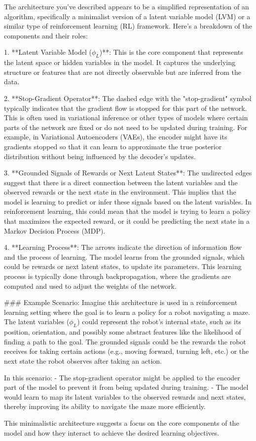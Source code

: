 The architecture you've described appears to be a simplified representation of an algorithm, specifically a minimalist version of a latent variable model (LVM) or a similar type of reinforcement learning (RL) framework. Here's a breakdown of the components and their roles:

1. **Latent Variable Model ($\phi_L$)**: This is the core component that represents the latent space or hidden variables in the model. It captures the underlying structure or features that are not directly observable but are inferred from the data.

2. **Stop-Gradient Operator**: The dashed edge with the "stop-gradient" symbol typically indicates that the gradient flow is stopped for this part of the network. This is often used in variational inference or other types of models where certain parts of the network are fixed or do not need to be updated during training. For example, in Variational Autoencoders (VAEs), the encoder might have its gradients stopped so that it can learn to approximate the true posterior distribution without being influenced by the decoder's updates.

3. **Grounded Signals of Rewards or Next Latent States**: The undirected edges suggest that there is a direct connection between the latent variables and the observed rewards or the next state in the environment. This implies that the model is learning to predict or infer these signals based on the latent variables. In reinforcement learning, this could mean that the model is trying to learn a policy that maximizes the expected reward, or it could be predicting the next state in a Markov Decision Process (MDP).

4. **Learning Process**: The arrows indicate the direction of information flow and the process of learning. The model learns from the grounded signals, which could be rewards or next latent states, to update its parameters. This learning process is typically done through backpropagation, where the gradients are computed and used to adjust the weights of the network.

### Example Scenario:
Imagine this architecture is used in a reinforcement learning setting where the goal is to learn a policy for a robot navigating a maze. The latent variables ($\phi_L$) could represent the robot's internal state, such as its position, orientation, and possibly some abstract features like the likelihood of finding a path to the goal. The grounded signals could be the rewards the robot receives for taking certain actions (e.g., moving forward, turning left, etc.) or the next state the robot observes after taking an action.

In this scenario:
- The stop-gradient operator might be applied to the encoder part of the model to prevent it from being updated during training.
- The model would learn to map its latent variables to the observed rewards and next states, thereby improving its ability to navigate the maze more efficiently.

This minimalistic architecture suggests a focus on the core components of the model and how they interact to achieve the desired learning objectives.